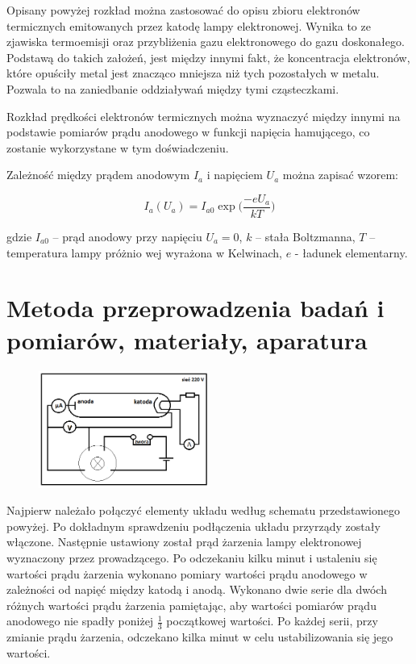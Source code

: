\documentclass[a4paper,10pt]{article}
\begin{document}
Opisany powyżej rozkład można zastosować  do opisu zbioru elektronów termicznych emitowanych przez katodę lampy elektronowej. Wynika to ze zjawiska termoemisji oraz przybliżenia gazu elektronowego do gazu doskonałego. Podstawą do takich założeń, jest między innymi fakt, że koncentracja elektronów, które opuściły metal jest znacząco mniejsza niż tych pozostałych w metalu. Pozwala to na zaniedbanie oddziaływań między tymi cząsteczkami.

Rozkład prędkości elektronów termicznych można wyznaczyć między innymi na podstawie pomiarów prądu anodowego w funkcji napięcia hamującego, co zostanie wykorzystane w tym doświadczeniu.

Zależność między prądem anodowym $I_a$ i napięciem $U_a$ można zapisać wzorem:

\begin{equation}
  I_a(U_a) = I_{a0}\exp{\Big(\frac{-eU_a}{kT}\Big)}
\end{equation}

gdzie $I_{a0}$ – prąd anodowy przy napięciu $U_a = 0$, $k$ – stała Boltzmanna, $T$ – temperatura lampy  próżnio
wej wyrażona w Kelwinach,  $e$ - ładunek elementarny.


\section{Metoda przeprowadzenia badań i pomiarów, materiały, aparatura}

\begin{figure}[H]
\centering
\includegraphics[width=0.5\textwidth]{schemat.png}
\end{figure}

Najpierw należało połączyć elementy układu według schematu przedstawionego powyżej. Po dokładnym sprawdzeniu podłączenia układu przyrządy zostały włączone. Następnie ustawiony został prąd żarzenia lampy elektronowej wyznaczony przez prowadzącego. Po odczekaniu kilku minut i ustaleniu się wartości prądu żarzenia wykonano pomiary wartości prądu anodowego w zależności od napięć między katodą i anodą. Wykonano dwie serie dla dwóch różnych wartości prądu żarzenia pamiętając, aby wartości pomiarów prądu anodowego nie spadły poniżej $\frac{1}{3}$ początkowej wartości. Po każdej serii, przy zmianie prądu żarzenia, odczekano kilka minut w celu ustabilizowania się jego wartości.
\end{document}
